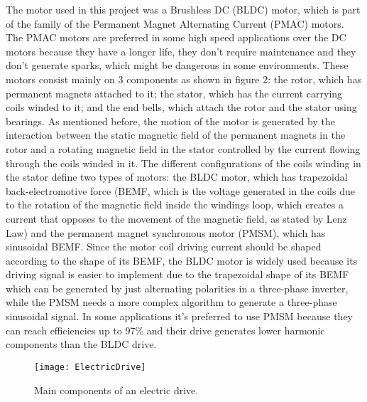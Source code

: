 The motor used in this project was a Brushless DC (BLDC) motor, which is part of the family of the Permanent Magnet Alternating Current (PMAC) motors. The PMAC motors are preferred in some high speed applications over the DC motors because they have a longer life, they don't require maintenance and they don't generate sparks, which might be dangerous in some environments. These motors consist mainly on 3 components as shown in figure 2: the rotor, which has permanent magnets attached to it; the stator, which has the current carrying coils winded to it; and the end bells, which attach the rotor and the stator using bearings. As mentioned before, the motion of the motor is generated by the interaction between the static magnetic field of the permanent magnets in the rotor and a rotating magnetic field in the stator controlled by the current flowing through the coils winded in it. The different configurations of the coils winding in the stator define two types of motors: the BLDC motor, which has trapezoidal back-electromotive force (BEMF, which is the voltage generated in the coils due to the rotation of the magnetic field inside the windings loop, which creates a current that opposes to the movement of the magnetic field, as stated by Lenz Law) and the permanent magnet synchronous motor (PMSM), which has sinusoidal BEMF. Since the motor coil driving current should be shaped according to the shape of its BEMF, the BLDC motor is widely used because its driving signal is easier to implement due to the trapezoidal shape of its BEMF which can be generated by just alternating polarities in a three-phase inverter, while the PMSM needs a more complex algorithm to generate a three-phase sinusoidal signal. In some applications it's preferred to use PMSM because they can reach efficiencies up to 97\% and their drive generates lower harmonic components than the BLDC drive.\\ 

\begin{figure} [H]
\centering\texttt{[image: ElectricDrive]}
\caption{Main components of an electric drive.}
\label{fig:Electric_Drive}
\end{figure}

